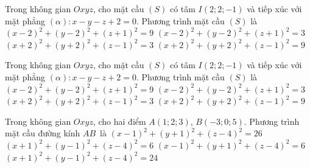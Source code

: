 \begin{ex}%
	Trong không gian $Oxyz$, cho mặt cầu $(S)$ có tâm $I(2;2;-1)$  và tiếp xúc với mặt phẳng $(\alpha)\colon x-y-z+2=0$. Phương trình mặt cầu $(S)$ là
	\choice 
		 {$(x-2)^2+(y-2)^2+(z+1)^2=9$}
		 {\True $(x-2)^2+(y-2)^2+(z+1)^2=3$}
		 {$(x+2)^2+(y+2)^2+(z-1)^2=3$}
		{$(x+2)^2+(y+2)^2+(z-1)^2=9$} 
\end{ex}

\begin{ex}%
	Trong không gian $Oxyz$, cho mặt cầu $(S)$ có tâm $I\left(2;2;-1\right)$ và tiếp xúc  với mặt phẳng $\left(\alpha\right)\colon x-y-z+2=0$. Phương trình mặt cầu $(S)$ là
	\choice 
		{$\left(x-2\right)^2+\left(y-2\right)^2+\left(z+1\right)^2=9$} 
		{\True $\left(x-2\right)^2+\left(y-2\right)^2+\left(z+1\right)^2=3$} 
		 {$\left(x+2\right)^2+\left(y+2\right)^2+\left(z-1\right)^2=3$}
		 {$\left(x+2\right)^2+\left(y+2\right)^2+\left(z-1\right)^2=9$}
\end{ex}

\begin{ex}%
	Trong không gian $Oxyz$, cho hai điểm $A(1;2;3)$,  $B(-3;0;5)$. Phương trình mặt cầu đường kính $AB$~là
	\choice 
		 {$(x-1)^2+(y+1)^2+(z-4)^2=26$}
		 {\True $(x+1)^2+(y-1)^2+(z-4)^2=6$}
		 {$(x-1)^2+(y+1)^2+(z-4)^2=6$}
		{$(x+1)^2+(y-1)^2+(z-4)^2=24$} 
\end{ex}

